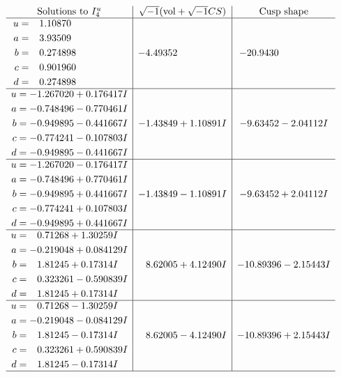 \documentclass[1p]{elsarticle_modified}
\theoremstyle{definition}
\newcommand{\I}{\sqrt{-1}}
\begin{document}
$$\begin{array}{c|c|c}  
\text{Solutions to }I^u_{4}& \I (\text{vol} + \sqrt{-1}CS) & \text{Cusp shape}\\
 \hline 
\begin{aligned}
u &= \phantom{-}1.10870\phantom{ +0.000000I} \\
a &= \phantom{-}3.93509\phantom{ +0.000000I} \\
b &= \phantom{-}0.274898\phantom{ +0.000000I} \\
c &= \phantom{-}0.901960\phantom{ +0.000000I} \\
d &= \phantom{-}0.274898\phantom{ +0.000000I}\end{aligned}
 & -4.49352\phantom{ +0.000000I} & -20.9430\phantom{ +0.000000I} \\ \hline\begin{aligned}
u &= -1.267020 + 0.176417 I \\
a &= -0.748496 - 0.770461 I \\
b &= -0.949895 - 0.441667 I \\
c &= -0.774241 - 0.107803 I \\
d &= -0.949895 - 0.441667 I\end{aligned}
 & -1.43849 + 1.10891 I & -9.63452 - 2.04112 I \\ \hline\begin{aligned}
u &= -1.267020 - 0.176417 I \\
a &= -0.748496 + 0.770461 I \\
b &= -0.949895 + 0.441667 I \\
c &= -0.774241 + 0.107803 I \\
d &= -0.949895 + 0.441667 I\end{aligned}
 & -1.43849 - 1.10891 I & -9.63452 + 2.04112 I \\ \hline\begin{aligned}
u &= \phantom{-}0.71268 + 1.30259 I \\
a &= -0.219048 + 0.084129 I \\
b &= \phantom{-}1.81245 + 0.17314 I \\
c &= \phantom{-}0.323261 - 0.590839 I \\
d &= \phantom{-}1.81245 + 0.17314 I\end{aligned}
 & \phantom{-}8.62005 + 4.12490 I & -10.89396 - 2.15443 I \\ \hline\begin{aligned}
u &= \phantom{-}0.71268 - 1.30259 I \\
a &= -0.219048 - 0.084129 I \\
b &= \phantom{-}1.81245 - 0.17314 I \\
c &= \phantom{-}0.323261 + 0.590839 I \\
d &= \phantom{-}1.81245 - 0.17314 I\end{aligned}
 & \phantom{-}8.62005 - 4.12490 I & -10.89396 + 2.15443 I\\
 \hline 
 \end{array}$$\newpage\newpage\renewcommand{\arraystretch}{1}
\end{document}
